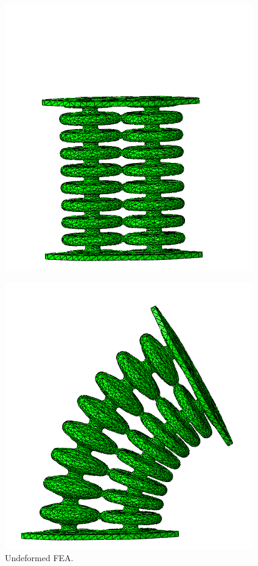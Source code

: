 \begin{figure}[H] 
  \begin{minipage}[b]{0.5\linewidth}
    \centering
    \includegraphics[width=\linewidth]{Figures/Chapter2/undeformed.png} 
    \caption{Undeformed FEA.} 
    \vspace{4ex}
    \label{fig3:FEMun} 
  \end{minipage}%
  \begin{minipage}[b]{0.5\linewidth}
    \centering
    \includegraphics[width=\linewidth]{Figures/Chapter2/deformed60kpa.png} 

\end{minipage}
\end{figure}
